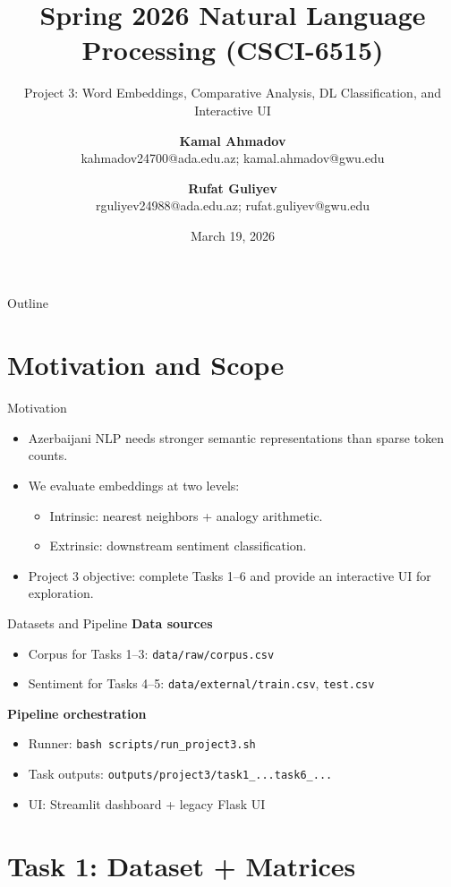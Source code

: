 \documentclass{beamer}
\title{Spring 2026 Natural Language Processing (CSCI-6515)}
\subtitle{Project 3: Word Embeddings, Comparative Analysis, DL Classification, and Interactive UI}
\author{
\textbf{Kamal Ahmadov} \\ \small kahmadov24700@ada.edu.az; kamal.ahmadov@gwu.edu \\ \and
\textbf{Rufat Guliyev} \\ \small rguliyev24988@ada.edu.az; rufat.guliyev@gwu.edu
}
\institute{ADA University \& George Washington University}
\date{March 19, 2026}
\begin{document}
\begin{frame}
  \titlepage
\end{frame}

\begin{frame}{Outline}
\tableofcontents
\end{frame}

\section{Motivation and Scope}

\begin{frame}{Motivation}
\begin{itemize}
  \item Azerbaijani NLP needs stronger semantic representations than sparse token counts.
  \item We evaluate embeddings at two levels:
  \begin{itemize}
    \item Intrinsic: nearest neighbors + analogy arithmetic.
    \item Extrinsic: downstream sentiment classification.
  \end{itemize}
  \item Project 3 objective: complete Tasks 1--6 and provide an interactive UI for exploration.
\end{itemize}
\end{frame}

\begin{frame}{Datasets and Pipeline}
\textbf{Data sources}
\begin{itemize}
  \item Corpus for Tasks 1--3: \texttt{data/raw/corpus.csv}
  \item Sentiment for Tasks 4--5: \texttt{data/external/train.csv}, \texttt{test.csv}
\end{itemize}

\vspace{0.3em}
\textbf{Pipeline orchestration}
\begin{itemize}
  \item Runner: \texttt{bash scripts/run\_project3.sh}
  \item Task outputs: \texttt{outputs/project3/task1\_...task6\_...}
  \item UI: Streamlit dashboard + legacy Flask UI
\end{itemize}
\end{frame}

\section{Task 1: Dataset + Matrices}
\end{document}
